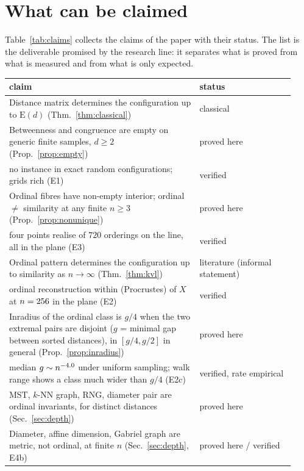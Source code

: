 \documentclass[11pt,a4paper]{article}
\theoremstyle{plain}
\theoremstyle{definition}
\theoremstyle{remark}
\newcommand{\Euc}{\mathrm{E}}
\begin{document}
\section{What can be claimed}\label{sec:claims}

Table~\ref{tab:claims} collects the claims of the paper with their status. The list is the deliverable promised by the research line: it separates what is proved from what is measured and from what is only expected.

\begin{table}[p]
\centering\footnotesize
\begin{tabular}{p{0.62\linewidth}>{\raggedright\arraybackslash}p{0.31\linewidth}}
\toprule
claim & status\\
\midrule
Distance matrix determines the configuration up to $\Euc(d)$ (Thm.~\ref{thm:classical}) & classical\\
Betweenness and congruence are empty on generic finite samples, $d\ge2$ (Prop.~\ref{prop:empty}) & proved here\\
\quad no instance in \EoneTotalConfigs{} exact random configurations; grids rich (E1) & verified\\
Ordinal fibres have non-empty interior; ordinal $\ne$ similarity at any finite $n\ge3$ (Prop.~\ref{prop:nonunique}) & proved here\\
\quad four points realise \EthreePatternsDone{} of $720$ orderings on the line, all in the plane (E3) & verified\\
Ordinal pattern determines the configuration up to similarity as $n\to\infty$ (Thm.~\ref{thm:kvl}) & literature (informal statement)\\
\quad ordinal reconstruction within \EtwoMedDtwoLast{} (Procrustes) of $X$ at $n=256$ in the plane (E2) & verified\\
Inradius of the ordinal class is $g/4$ when the two extremal pairs are disjoint ($g$ = minimal gap between sorted distances), in $[g/4,g/2]$ in general (Prop.~\ref{prop:inradius}) & proved here\\
\quad median $g\sim n^{-4.0}$ under uniform sampling; walk range shows a class much wider than $g/4$ (E2c) & verified, rate empirical\\
MST, $k$-NN graph, RNG, diameter pair are ordinal invariants, for distinct distances (Sec.~\ref{sec:depth}) & proved here\\
Diameter, affine dimension, Gabriel graph are metric, not ordinal, at finite $n$ (Sec.~\ref{sec:depth}, E4b) & proved here / verified\\

\end{tabular}
\end{table}
\end{document}
